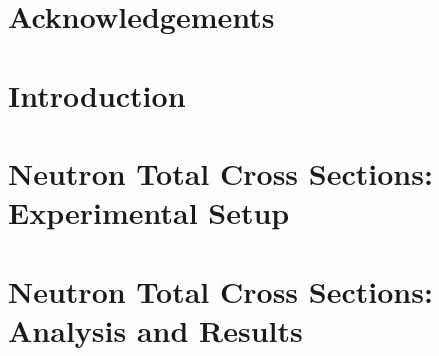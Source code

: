 \documentclass[12pt,twoside]{book} %
\newcommand\blankpage{%
    \null
    \thispagestyle{empty}%
    \addtocounter{page}{-1}%
\newpage}
\newcommand{\textDirectory}{text}
\begin{document}
\frontmatter




\fancyhead{} %
\fancyhead[RO]{\MakeUppercase{\leftmark}} %
\fancyhead[LE]{\MakeUppercase{\rightmark}} %

\begingroup
\tableofcontents
\endgroup
\clearpage

\begingroup
\let\cleardoublepage\clearpage
{}
\listoffigures
\endgroup

\clearpage


\begingroup
\let\cleardoublepage\clearpage
{}
\listoftables
\endgroup

\clearpage
{}

\begingroup
\let\cleardoublepage\clearpage
\chapter*{Acknowledgements}

\endgroup



\afterpage{\blankpage}
\clearpage

\mainmatter

\fancyhead{} %
\fancyhead[LE]{\MakeUppercase{\rightmark}} %

\chapter{Introduction} \label{introduction}


\chapter{Neutron Total Cross Sections: Experimental Setup} \label{TCSExperiment}


\chapter{Neutron Total Cross Sections: Analysis and Results} \label{TCSAnalysis}

\end{document}
